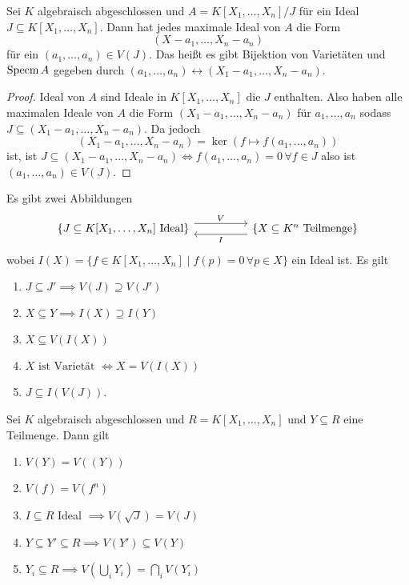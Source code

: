 \begin{Satz}
    Sei $K$ algebraisch abgeschlossen und $A=K[X_1,\dots,X_n]/J$ für ein Ideal $J\subseteq K[X_1,\dots,X_n]$.
    Dann hat jedes maximale Ideal von $A$ die Form $$(X-a_1,\dots,X_n-a_n)$$ für ein $(a_1,\dots,a_n)\in V(J)$.
    Das heißt es gibt Bijektion von Varietäten und $\operatorname{Specm} A$ gegeben durch $(a_1,\dots,a_n)\leftrightarrow (X_1-a_1,\dots,X_n-a_n)$.
\end{Satz}
\begin{proof}
    Ideal von $A$ sind Ideale in $K[X_1,\dots,X_n]$ die $J$ enthalten. Also haben alle maximalen Ideale von $A$ die Form $(X_1-a_1,\dots,X_n-a_n)$ für $a_1,\dots,a_n$ sodass $J\subseteq (X_1-a_1,\dots,X_n-a_n)$. Da jedoch 
    $$(X_1-a_1,\dots,X_n-a_n)=\ker(f\mapsto f(a_1,\dots,a_n))$$ ist, ist $J\subseteq (X_1-a_1,\dots,X_n-a_n)\iff f(a_1,\dots,a_n)=0\, \forall f\in J$ also ist $(a_1,\dots,a_n)\in V(J)$.
\end{proof}
\begin{Bem}
    Es gibt zwei Abbildungen
    $$%
\begin{tikzcd}
{\{J\subseteq K[X_1,\dots,X_n] \text{ Ideal}\}} \arrow[rr, "V", shift left=2] &  & \{X\subseteq K^n\text{ Teilmenge}\} \arrow[ll, "I", shift left=2]
\end{tikzcd}$$
wobei $I(X)=\{f\in K[X_1,\dots,X_n]\mid f(p)=0\, \forall p\in X\}$ ein Ideal ist.
Es gilt 
\begin{enumerate}
    \item $J\subseteq J'\implies V(J)\supseteq V(J')$
    \item $X\subseteq Y\implies I(X)\supseteq I(Y)$
    \item $X\subseteq V(I(X))$
    \item $X \text{ ist Varietät } \iff X=V(I(X))$
    \item $J\subseteq I(V(J))$.
\end{enumerate}
\end{Bem}
\begin{Bem}
    Sei $K$ algebraisch abgeschlossen und $R=K[X_1,\dots,X_n]$ und $Y\subseteq R$ eine Teilmenge. Dann gilt
    \begin{enumerate}
        \item $V(Y)=V((Y))$
        \item $V(f)=V(f^n)$
        \item $I\subseteq R$ Ideal $\implies V(\sqrt{J})=V(J)$
        \item $Y\subseteq Y'\subseteq R\implies V(Y')\subseteq V(Y)$
        \item $Y_i\subseteq R\implies V(\bigcup_iY_i)=\bigcap_iV(Y_i)$
        
    \end{enumerate}
\end{Bem}
